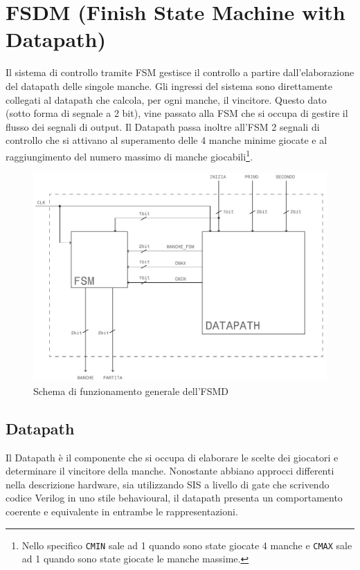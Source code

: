 \documentclass[a4paper]{report}
\begin{document}
\chapter{FSDM (Finish State Machine with Datapath)}
Il sistema di controllo tramite FSM gestisce il controllo a partire dall'elaborazione del datapath delle singole manche.
Gli ingressi del sistema sono direttamente collegati al datapath che calcola, per ogni manche, il vincitore. Questo dato (sotto forma di segnale a 2 bit), vine passato alla FSM che si occupa di gestire il flusso dei segnali di output.
Il Datapath passa inoltre all'FSM 2 segnali di controllo che si attivano al superamento delle 4 manche minime giocate e al raggiungimento del numero massimo di manche giocabili\footnote{Nello specifico \texttt{CMIN} sale ad 1 quando sono state giocate 4 manche e \texttt{CMAX} sale ad 1 quando sono state giocate le manche massime.}.

    \begin{figure}[h]
        \centering
        \includegraphics[width=\textwidth]{FSMD_generale.pdf}
        \caption[FSMD]{Schema di funzionamento generale dell'FSMD}
        \label{img:FSMD}
    \end{figure}


\section{Datapath}

Il Datapath è il componente che si occupa di elaborare le scelte dei giocatori e determinare il vincitore della manche.
Nonostante abbiano approcci differenti nella descrizione hardware, sia utilizzando SIS a livello di gate che scrivendo codice Verilog in uno stile behavioural, il datapath presenta un comportamento coerente e equivalente in entrambe le rappresentazioni.
\end{document}
